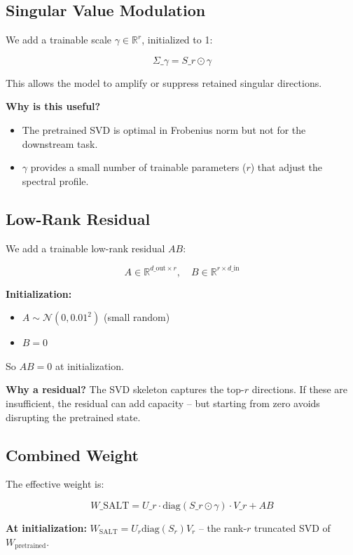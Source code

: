 \subsection{Singular Value Modulation}

We add a trainable scale $\gamma \in \mathbb{R}^r$, initialized to 1:

\[
\Sigma\_\gamma = S\_r \odot \gamma
\tag{4.3}
\]

This allows the model to amplify or suppress retained singular directions.

\textbf{Why is this useful?}
\begin{itemize}
\item The pretrained SVD is optimal in Frobenius norm but not for the downstream
  task.
\item $\gamma$ provides a small number of trainable parameters ($r$) that adjust
  the spectral profile.

\end{itemize}
\subsection{Low-Rank Residual}

We add a trainable low-rank residual $AB$:

\[
A \in \mathbb{R}^{d\_\text{out} \times r}, \quad 
B \in \mathbb{R}^{r \times d\_\text{in}}
\tag{4.4}
\]

\textbf{Initialization:}
\begin{itemize}
\item $A \sim \mathcal{N}(0, 0.01^2)$ (small random)
\item $B = 0$

\end{itemize}
So $AB = 0$ at initialization.

\textbf{Why a residual?} The SVD skeleton captures the top-$r$ directions. If 
these are insufficient, the residual can add capacity -- but starting from 
zero avoids disrupting the pretrained state.

\subsection{Combined Weight}

The effective weight is:

\[
W\_\text{SALT} = U\_r \cdot \text{diag}(S\_r \odot \gamma) \cdot V\_r + A B
\tag{4.5}
\]

\textbf{At initialization:} $W_\text{SALT} = U_r \text{diag}(S_r) V_r$ -- the 
rank-$r$ truncated SVD of $W_\text{pretrained}$.

